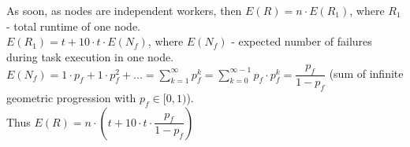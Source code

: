 As soon, as nodes are independent workers, then $E(R) = n \cdot E(R_1)$, where $R_1$ - total runtime of one node.\\
$E(R_1) = t + 10\cdot t \cdot E(N_f)$, where $E(N_f)$ - expected number of failures during task execution in one node.\\
$E(N_f) = 1 \cdot p_f + 1 \cdot p_f^2 +... = \sum_{k = 1}^{\infty} p_f^k = \sum_{k = 0}^{\infty - 1} p_f\cdot p_f^k = \dfrac{p_f}{1 - p_f}$ (sum of infinite geometric progression with $p_f \in [0, 1)$).\\
Thus $E(R) = n\cdot (t + 10 \cdot t \cdot \dfrac{p_f}{1 - p_f})$